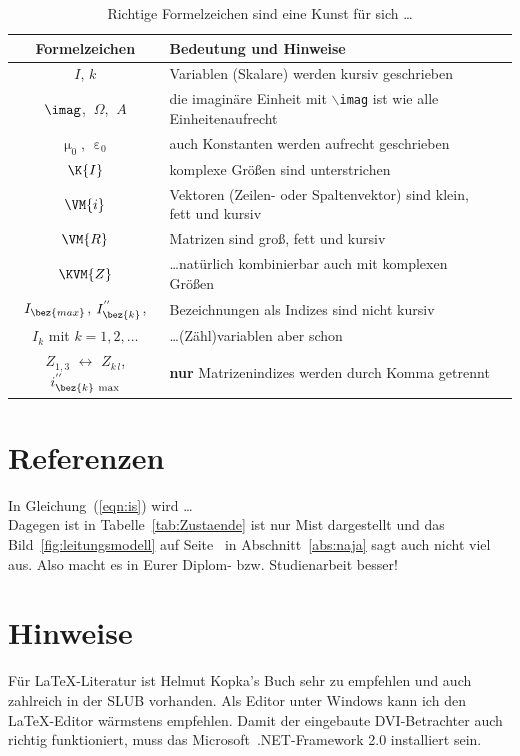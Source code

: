 \begin{table}[ht!]
 \centering
 \caption{Richtige Formelzeichen sind eine Kunst für sich \dots \cite{din1303,din1304}}
 \label{tab:Formelzeichen}
 \begin{tabular}{|c|l|l|}
   \hline
   Formelzeichen & Bedeutung und Hinweise \\
   \hline
   $I$, $k$ & Variablen (Skalare) werden kursiv geschrieben \\
   $\imag$, $\SI{}{\Omega}$, $\SI{}{A}$ & die imaginäre Einheit mit $\backslash$\texttt{imag} ist wie alle Einheiten\footnotemark aufrecht \\
   $\upmu_0$, $\upepsilon_0$ & auch Konstanten werden aufrecht geschrieben \\
   $\K{I}$ & komplexe Größen sind unterstrichen \\
   $\VM{i}$ & Vektoren (Zeilen- oder Spaltenvektor) sind klein, fett und kursiv \\
   $\VM{R}$ & Matrizen sind groß, fett und kursiv \\
   $\KVM{Z}$ & \dots natürlich kombinierbar auch mit komplexen Größen \\
   $I_\bez{max}$, $I_\bez{k}^{''}$,  & Bezeichnungen als Indizes sind nicht kursiv \\
   $I_{k}$ mit $k=1,2,\dots$ & \dots (Zähl)variablen aber schon \\
   $Z_{1,3}$ $\leftrightarrow$ $Z_{k\,l}$, $i^{''}_{\bez{k}\:\max}$  & \textbf{nur} Matrizenindizes werden durch Komma getrennt \\
   \hline
  \end{tabular}
\end{table}

\section{Referenzen}
In Gleichung~(\ref{eqn:is}) wird \dots \\
Dagegen ist in Tabelle~\ref{tab:Zustaende} ist nur Mist dargestellt
und das Bild~\ref{fig:leitungsmodell} auf
Seite~\pageref{fig:leitungsmodell} in Abschnitt~\ref{abs:naja} sagt
auch nicht viel aus. Also macht es in Eurer Diplom- bzw. Studienarbeit
besser!

\section{Hinweise}
Für \LaTeX-Literatur ist Helmut Kopka's Buch \cite{kopka} sehr zu
empfehlen und auch zahlreich in der SLUB vorhanden. Als Editor unter
Windows kann ich den \LaTeX-Editor \cite{led} wärmstens
empfehlen. Damit der eingebaute DVI-Betrachter auch richtig
funktioniert, muss das Microsoft~.NET-Framework 2.0 installiert sein.